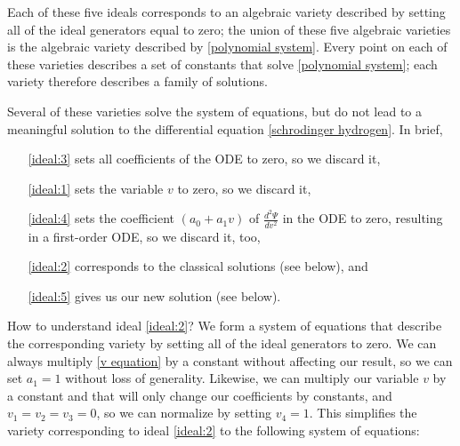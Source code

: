 \documentclass{article}
\begin{document}
Each of these five ideals corresponds to an algebraic variety described by setting
all of the ideal generators equal to zero; the union of these five algebraic varieties is the algebraic variety described by \eqref{polynomial system}.
Every point on each of these varieties describes a set of constants that solve \eqref{polynomial system};
each variety therefore describes a family of solutions.

Several of these varieties solve the system of equations, but do not lead to a meaningful solution to the differential equation
\eqref{schrodinger hydrogen}.  In brief,

\begin{itemize}
\item[\eqref{ideal:3}] sets all coefficients of the ODE to zero, so we discard it,
\item[\eqref{ideal:1}] sets the variable $v$ to zero, so we discard it,
\item[\eqref{ideal:4}] sets the coefficient $(a_0 + a_1 v)$ of
$\frac{d^2\Psi}{dv^2}$
in the ODE to zero, resulting in a first-order ODE, so we discard it, too,
\item[\eqref{ideal:2}] corresponds to the classical solutions (see below), and
\item[\eqref{ideal:5}] gives us our new solution (see below).

\end{itemize}

How to understand ideal \eqref{ideal:2}?  We form a system of equations that describe the corresponding
variety by setting all of the ideal generators to zero.
We can always multiply \eqref{v equation} by a constant without affecting our result, so we can set $a_1=1$ without loss of generality.
Likewise, we can multiply our variable $v$ by a constant and that will only change our coefficients by constants,
and $v_1=v_2=v_3=0$, so we can normalize by setting $v_4=1$.  This simplifies the variety corresponding to
ideal \eqref{ideal:2} to the following system of equations:

\end{document}
